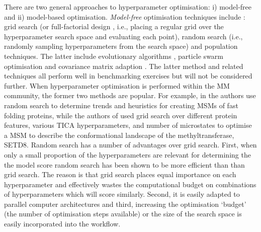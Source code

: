 There are two general approaches to hyperparameter optimisation: i) model-free and ii) model-based optimisation.\cite{feurer2019hyperparameter} \emph{Model-free} optimisation techniques include \cite{feurer2019hyperparameter}: grid search (or full-factorial design \cite{c1997montgomery}, i.e., placing a regular grid over the hyperparameter search space and evaluating each point), random search (i.e., randomly sampling hyperparameters from the search space)  and population techniques. The latter include evolutionary algorithms \cite{simon2013evolutionary},  particle swarm optimisation \cite{kennedyParticleSwarmOptimization1995}\cite{eberhart1998comparison} and covariance matrix adaption \cite{hansenCMAEvolutionStrategy2016}. The latter method and related techniques all perform well in benchmarking exercises \cite{dufosse2019benchmarking}\cite{faury2019benchmarking}\cite{bodner2019benchmarking} but will not be considered further. When hyperparameter optimisation is performed within the MM community, the former two methods are popular. For example, in \cite{husicOptimizedParameterSelection2016} the authors use random search to determine trends and heuristics for creating MSMs of fast folding proteins, while the authors of \cite{chenDynamicConformationalLandscape2019} used grid search over different protein features, various TICA hyperparameters, and number of microstates to optimise a MSM to describe the conformational landscape of the methyltransferase, SETD8. Random search has a number of advantages over grid search. First, when only a small proportion of the hyperparameters are relevant for determining the the model score random search has been shown \cite{bergstrajamesbergstraRandomSearchHyperParameter2012} to be more efficient than  than grid search. The reason is that grid search places equal importance on each hyperparameter and effectively wastes the computational budget on combinations of hyperparameters which will score similarly. Second, it is easily adapted to parallel computer architectures and third, increasing the optimisation `budget' (the number of optimisation steps available) or the size of the search space is easily incorporated into the workflow. \cite{feurer2019hyperparameter} 

